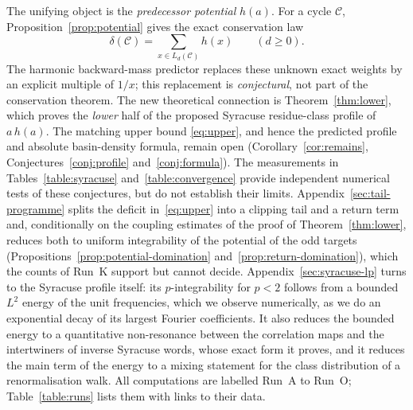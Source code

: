 \documentclass[12pt]{amsart}
\theoremstyle{definition}
\theoremstyle{remark}
\begin{document}
The unifying object is the \emph{predecessor potential} $h(a)$.
For a cycle $\mathcal C$, Proposition~\ref{prop:potential} gives the exact
conservation law
\[
  \delta(\mathcal C)=\sum_{x\in L_d(\mathcal C)} h(x)
  \qquad(d\ge0).
\]
The harmonic backward-mass predictor replaces these unknown exact weights
by an explicit multiple of $1/x$; this replacement is \emph{conjectural}, not
part of the conservation theorem. The new theoretical connection is
Theorem~\ref{thm:lower}, which proves the \emph{lower} half of the proposed
Syracuse residue-class profile of $a\,h(a)$. The matching upper bound
\eqref{eq:upper}, and hence the predicted profile and absolute basin-density
formula, remain open (Corollary~\ref{cor:remains},
Conjectures~\ref{conj:profile} and~\ref{conj:formula}). The measurements in
Tables~\ref{table:syracuse} and~\ref{table:convergence} provide independent
numerical tests of these conjectures, but do not establish their limits.
Appendix~\ref{sec:tail-programme} splits the deficit in~\eqref{eq:upper} into a
clipping tail and a return term and, conditionally on the coupling estimates of
the proof of Theorem~\ref{thm:lower}, reduces both to uniform
integrability of the potential of the odd targets
(Propositions~\ref{prop:potential-domination} and~\ref{prop:return-domination}), which the counts of Run~K support
but cannot decide. Appendix~\ref{sec:syracuse-lp} turns to the Syracuse profile itself: its $p$-integrability for $p<2$ follows from a bounded $L^2$ energy of the unit frequencies, which we observe numerically, as we do an exponential decay of its largest Fourier coefficients. It also reduces the bounded energy to a quantitative non-resonance between the correlation maps and the intertwiners of inverse Syracuse words, whose exact form it proves, and it reduces the main term of the energy to a mixing statement for the class distribution of a renormalisation walk. All computations are labelled Run~A to Run~O;
Table~\ref{table:runs} lists them with links to their data.
\end{document}
